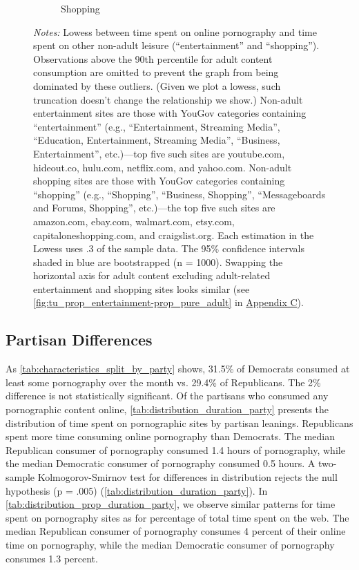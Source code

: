 \documentclass[12pt,twoside]{article}
\begin{document}
\begin{figure}[!ht]
\begin{subfigure}[b]{0.495\textwidth}
         \caption{Shopping}
     \end{subfigure}
\caption*{\footnotesize \emph{Notes:} Lowess between time spent on online pornography and time spent on other non-adult leisure (``entertainment'' and ``shopping''). Observations above the 90th percentile for adult content consumption are omitted to prevent the graph from being dominated by these outliers. (Given we plot a lowess, such truncation doesn't change the relationship we show.) Non-adult entertainment sites are those with YouGov categories containing ``entertainment'' (e.g., ``Entertainment, Streaming Media'', ``Education, Entertainment, Streaming Media'', ``Business, Entertainment'', etc.)---top five such sites are youtube.com, hideout.co, hulu.com, netflix.com, and yahoo.com. Non-adult shopping sites are those with YouGov categories containing ``shopping'' (e.g., ``Shopping'', ``Business, Shopping'', ``Messageboards and Forums, Shopping'', etc.)---the top five such sites are amazon.com, ebay.com, walmart.com, etsy.com, capitaloneshopping.com, and craigslist.org. Each estimation in the Lowess uses .3 of the sample data.
The 95\% confidence intervals shaded in blue are bootstrapped (n = 1000). Swapping the horizontal axis for adult content excluding adult-related entertainment and shopping sites looks similar (see \cref{fig:tu_prop_entertainment-prop_pure_adult} in \hyperref[sm:smC]{Appendix C}). 
}
\end{figure}

\subsection{Partisan Differences}
\label{subsec:partisan_differences}
As \cref{tab:characteristics_split_by_party} shows, 31.5\% of Democrats consumed at least some pornography over the month vs. 29.4\% of Republicans. The 2\% difference is not statistically significant. Of the partisans who consumed any pornographic content online, \cref{tab:distribution_duration_party} presents the distribution of time spent on pornographic sites by partisan leanings. Republicans spent more time consuming online pornography than Democrats. The median Republican consumer of pornography consumed 1.4 hours of pornography, while the median Democratic consumer of pornography consumed 0.5 hours. A two-sample Kolmogorov-Smirnov test for differences in distribution rejects the null hypothesis (p = .005) (\cref{tab:distribution_duration_party}). In \cref{tab:distribution_prop_duration_party}, we observe similar patterns for time spent on pornography sites as for percentage of total time spent on the web. The median Republican consumer of pornography consumes 4 percent of their online time on pornography, while the median Democratic consumer of pornography consumes 1.3 percent.
\end{document}
